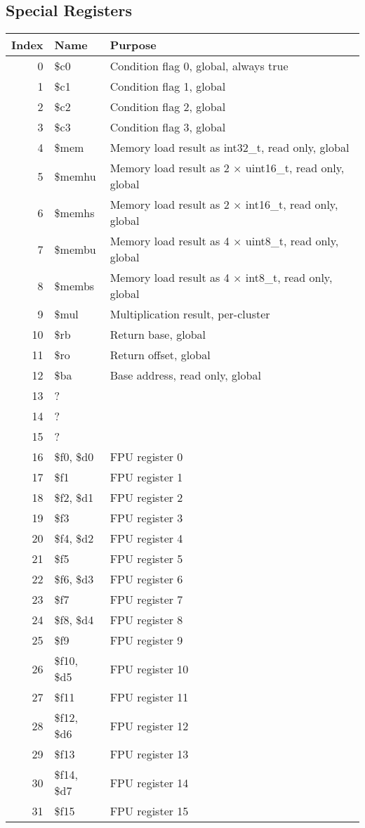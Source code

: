 \documentclass[10pt,DIV12]{scrartcl}
\begin{document}
\subsection{Special Registers}

\begin{tabular}{rll}
  \toprule
  Index & Name & Purpose \\
  \midrule
  0 & \$c0 & Condition flag 0, global, always true \\
  1 & \$c1 & Condition flag 1, global \\
  2 & \$c2 & Condition flag 2, global \\
  3 & \$c3 & Condition flag 3, global \\
  \cmidrule{1-3}
  4 & \$mem & Memory load result as int32\_t, read only, global \\
  5 & \$memhu & Memory load result as 2 $\times$ uint16\_t, read only, global \\
  6 & \$memhs & Memory load result as 2 $\times$ int16\_t, read only, global \\
  7 & \$membu & Memory load result as 4 $\times$ uint8\_t, read only, global \\
  8 & \$membs & Memory load result as 4 $\times$ int8\_t, read only, global \\
  \cmidrule{1-3}
  9 & \$mul & Multiplication result, per-cluster \\
  \cmidrule{1-3}
  10 & \$rb & Return base, global \\
  11 & \$ro & Return offset, global \\
  12 & \$ba & Base address, read only, global \\
  \cmidrule{1-3}
  13 & ? & \\
  14 & ? & \\
  15 & ? & \\
  \cmidrule{1-3}
  16 & \$f0, \$d0 & FPU register 0 \\
  17 & \$f1 & FPU register 1 \\
  18 & \$f2, \$d1 & FPU register 2 \\
  19 & \$f3 & FPU register 3 \\
  20 & \$f4, \$d2 & FPU register 4 \\
  21 & \$f5 & FPU register 5 \\
  22 & \$f6, \$d3 & FPU register 6 \\
  23 & \$f7 & FPU register 7 \\
  24 & \$f8, \$d4 & FPU register 8 \\
  25 & \$f9 & FPU register 9 \\
  26 & \$f10, \$d5 & FPU register 10 \\
  27 & \$f11 & FPU register 11 \\
  28 & \$f12, \$d6 & FPU register 12 \\
  29 & \$f13 & FPU register 13 \\
  30 & \$f14, \$d7 & FPU register 14 \\
  31 & \$f15 & FPU register 15 \\
  \bottomrule
\end{tabular}
\end{document}
